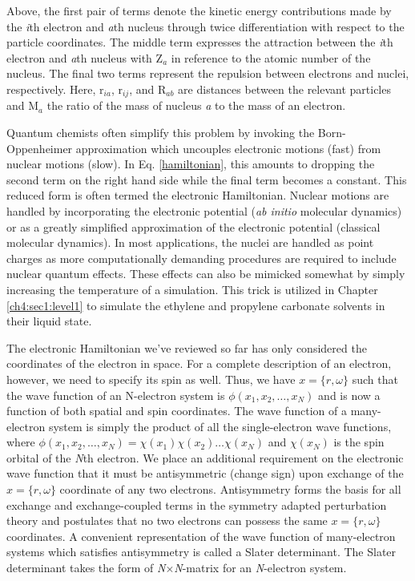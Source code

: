 \begin{theory}
   Above, the first pair of terms denote the kinetic energy contributions made by the \emph{i}th electron and
   \emph{a}th nucleus through twice differentiation with respect to the particle coordinates. The middle term
   expresses the attraction between the \emph{i}th electron and \emph{a}th nucleus with Z$_{a}$ in reference to
   the atomic number of the nucleus. The final two terms represent the repulsion between electrons and nuclei,
   respectively. Here, r$_{ia}$, r$_{ij}$, and R$_{ab}$ are distances between the relevant particles and M$_{a}$ 
   the ratio of the mass of nucleus \emph{a} to the mass of an electron.
 
   Quantum chemists often simplify this problem by invoking the Born-Oppenheimer approximation which uncouples 
   electronic motions (fast) from nuclear motions (slow). In Eq. \ref{hamiltonian}, this amounts to dropping
   the second term on the right hand side while the final term becomes a constant. This reduced form is often
   termed the electronic Hamiltonian. Nuclear motions are handled by incorporating the electronic potential 
   (\emph{ab initio} molecular dynamics) or as a greatly simplified approximation of the electronic potential
   (classical molecular dynamics). In most applications, the nuclei are handled as point charges as more 
   computationally demanding procedures are required to include nuclear quantum effects. These effects can also
   be mimicked somewhat by simply increasing the temperature of a simulation. This trick is utilized in Chapter
   \ref{ch4:sec1:level1} to simulate the ethylene and propylene carbonate solvents in their liquid state.
 
   The electronic Hamiltonian we've reviewed so far has only considered the coordinates of the electron in space.
   For a complete description of an electron, however, we need to specify its spin as well. Thus, we have 
   $x=\{r,\omega\}$ such that the wave function of an N-electron system is 
   $\phi(x_{1}, x_{2}, \dots, x_{N})$ and is now a function of both spatial and spin coordinates. 
   The wave function of a many-electron system is simply the product of all the single-electron wave functions, 
   where $\phi(x_{1}, x_{2}, \dots, x_{N}) = \chi(x_{1})\chi(x_{2})\dots\chi(x_{N})$ and $\chi(x_{N})$ is the spin
   orbital of the \emph{N}th electron. We place an additional requirement on the electronic wave function that 
   it must be antisymmetric (change sign) upon exchange of the $x=\{r,\omega\}$ coordinate of any two electrons. 
   Antisymmetry forms the basis for all exchange and exchange-coupled terms in the symmetry adapted perturbation 
   theory and postulates that no two electrons can possess the same $x=\{r,\omega\}$ coordinates. A convenient 
   representation of the wave function of many-electron systems which satisfies antisymmetry is called a Slater 
   determinant. The Slater determinant takes the form of \emph{N}$\times$\emph{N}-matrix for an \emph{N}-electron
   system.
   

\end{theory}
